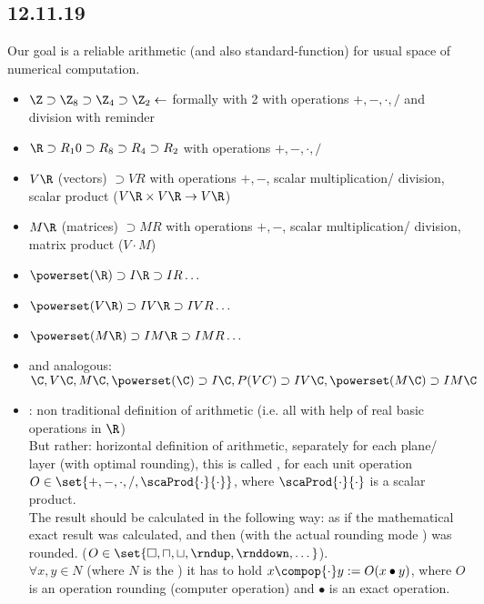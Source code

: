 \subsection*{12.11.19}
Our goal is a reliable arithmetic (and also standard-function) for usual space of numerical computation.
\begin{itemize}
	\item $\Z\supset \Z_8\supset \Z_4 \supset \Z_2 \gets$ formally with 2 with operations $+,-, \cdot, /$ and division with reminder
	\item $\R \supset R_10 \supset R_8 \supset R_4 \supset R_2$ with operations $+,-, \cdot, /$
	\item $V\R$ (vectors) $\supset VR$ with operations $+,-$, scalar multiplication/ division, scalar product ($V\R \times V\R \to V\R$)
	\item $M\R$ (matrices) $\supset  MR$ with operations $+,-$, scalar multiplication/ division, matrix product ($V \cdot M$)
	\item $\powerset(\R) \supset I\R \supset IR \dots$
	\item $\powerset(V\R) \supset  IV\R \supset IVR \dots$
	\item $\powerset(M\R) \supset  IM\R \supset IMR \dots$
	\item and analogous: $\C, V\C, M\C, \powerset(\C) \supset I\C, P(VC) \supset IV\C, \powerset(M\C) \supset  IM\C$
	\item {}: non traditional definition of arithmetic (i.e. all with help of real basic operations in $\R$)\\
	But rather: horizontal definition of arithmetic, separately for each plane/ layer (with optimal rounding), this is called , for each unit operation $O \in \set{+,-, \cdot,/,\scaProd{\cdot}{\cdot}}$, where $\scaProd{\cdot}{\cdot}$ is a scalar product.\\
	The result should be calculated in the following way: as if the mathematical exact result was calculated, and then (with the actual rounding mode ) was rounded. ($O \in \set{\square, \sqcap, \sqcup, \rndup, \rnddown, \dots}$).\\
	$\forall x,y\in N$ (where $N$ is the ) it has to hold $x\compop{\cdot} y:= O(x \bullet y)$, where $O$ is an operation rounding (computer operation) and $\bullet$ is an exact operation.
\end{itemize}
